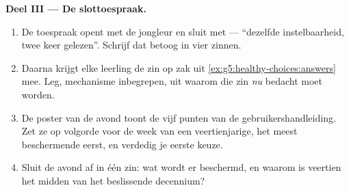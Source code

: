 \begin{problem}
\medskip\noindent\textbf{Deel III --- De slottoespraak.}
\begin{enumerate}[resume]
  \item De toespraak opent met de jongleur en sluit met  ---
        ``dezelfde instelbaarheid, twee keer gelezen''. Schrijf dat betoog
        in vier zinnen.
  \item Daarna krijgt elke leerling de zin op zak uit
        \cref{ex:g5:healthy-choices:answers} mee. Leg, mechanisme
        inbegrepen, uit waarom die zin \emph{nu} bedacht moet worden.
  \item De poster van de avond toont de vijf punten van de
        gebruikershandleiding. Zet ze op volgorde voor de week van een
        veertienjarige, het meest beschermende eerst, en verdedig je
        eerste keuze.
  \item Sluit de avond af in één zin: wat wordt er beschermd, en waarom is
        veertien het midden van het beslissende decennium?
\end{enumerate}
\end{problem}
